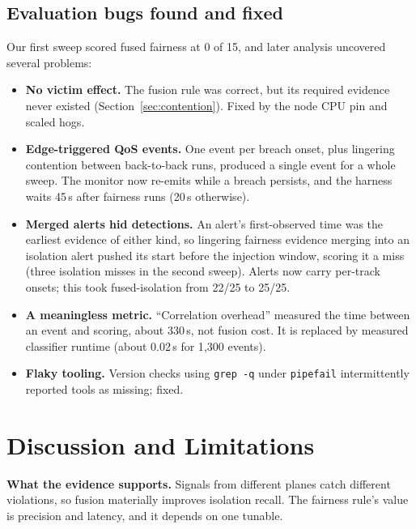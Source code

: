 \documentclass[conference]{IEEEtran}
\newcommand{\code}[1]{\texttt{\small #1}}
\begin{document}
\subsection{Evaluation bugs found and fixed}
\label{sec:fixes}
Our first sweep scored fused fairness at 0 of 15, and later analysis uncovered several problems:
\begin{itemize}
\item \textbf{No victim effect.} The fusion rule was correct, but its required evidence never existed (Section~\ref{sec:contention}). Fixed by the node CPU pin and scaled hogs.
\item \textbf{Edge-triggered QoS events.} One event per breach onset, plus lingering contention between back-to-back runs, produced a single event for a whole sweep. The monitor now re-emits while a breach persists, and the harness waits 45\,s after fairness runs (20\,s otherwise).
\item \textbf{Merged alerts hid detections.} An alert's first-observed time was the earliest evidence of either kind, so lingering fairness evidence merging into an isolation alert pushed its start before the injection window, scoring it a miss (three isolation misses in the second sweep). Alerts now carry per-track onsets; this took fused-isolation from 22/25 to 25/25.
\item \textbf{A meaningless metric.} ``Correlation overhead'' measured the time between an event and scoring, about 330\,s, not fusion cost. It is replaced by measured classifier runtime (about 0.02\,s for 1{,}300 events).
\item \textbf{Flaky tooling.} Version checks using \code{grep -q} under \code{pipefail} intermittently reported tools as missing; fixed.
\end{itemize}

\section{Discussion and Limitations}
\textbf{What the evidence supports.} Signals from different planes catch different violations, so fusion materially improves isolation recall. The fairness rule's value is precision and latency, and it depends on one tunable.
\end{document}
